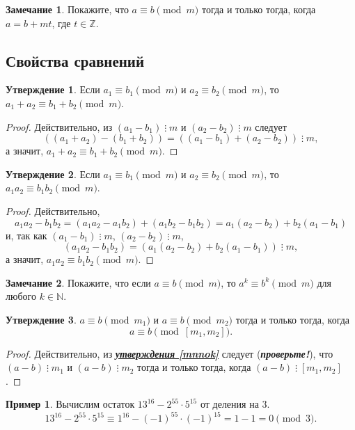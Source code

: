 \documentclass[14pt, a4paper]{extarticle}
\theoremstyle{definition}
\newtheorem*{remark}{Замечание}
\newtheorem{example}{Пример}
\newtheorem{statement}{Утверждение}
\newcommand{\divisible}{\mathop{\vdots}}
\begin{document}
	\begin{remark}
		Покажите, что $a\equiv b\pmod{m}$ тогда и только тогда, когда $a=b+mt$, где $t\in\mathbb{Z}$.
	\end{remark}

\subsection{Свойства сравнений}
\label{prop}

	\begin{statement}
		Если $a_1\equiv b_1\pmod{m}$ и $a_2\equiv b_2\pmod{m}$, то $a_1+a_2\equiv b_1+b_2\pmod{m}$.
	\end{statement}
	\begin{proof}
		Действительно, из $(a_1-b_1)\divisible m$ и $(a_2-b_2)\divisible m$ следует $$((a_1+a_2)-(b_1+b_2))=((a_1-b_1)+(a_2-b_2))\divisible m,$$ а значит, $a_1+a_2\equiv b_1+b_2\pmod{m}$.
	\end{proof}

	\begin{statement}
	\label{mult}
		Если $a_1\equiv b_1\pmod{m}$ и $a_2\equiv b_2\pmod{m}$, то $a_1a_2\equiv b_1b_2\pmod{m}$.
	\end{statement}
	\begin{proof}
		Действительно, $$a_1a_2-b_1b_2=(a_1a_2-a_1b_2)+(a_1b_2-b_1b_2)=a_1(a_2-b_2)+b_2(a_1-b_1)$$ и, так как $(a_1-b_1)\divisible m$, $(a_2-b_2)\divisible m$, $$(a_1a_2-b_1b_2)=(a_1(a_2-b_2)+b_2(a_1-b_1))\divisible m,$$ а значит, $a_1a_2\equiv b_1b_2\pmod{m}$.
	\end{proof}

	\begin{remark}
		Покажите, что если $a\equiv b\pmod{m}$, то $a^k\equiv b^k\pmod{m}$ для любого $k\in\mathbb{N}$.
	\end{remark}

	\begin{statement}
		$a\equiv b\pmod{m_1}$ и $a\equiv b\pmod{m_2}$ тогда и только тогда, когда $$a\equiv b\pmod{[m_1,m_2]}.$$
	\end{statement}
	\begin{proof}
		Действительно, из \hyperref[mnnok]{\textbf{\textit{утверждения \ref*{mnnok}}}} следует (\textbf{\textit{про\-верьте!}}), что $(a-b)\divisible m_1$ и $(a-b)\divisible m_2$ тогда и только тогда, когда $(a-b)\divisible[m_1,m_2]$.
	\end{proof}

	\begin{example}
		Вычислим остаток $13^{16}-2^{55}\cdot5^{15}$ от деления на $3$.
		$$13^{16}-2^{55}\cdot5^{15}\equiv1^{16}-(-1)^{55}\cdot(-1)^{15}=1-1=0\pmod{3}.$$
	\end{example}
\end{document}
